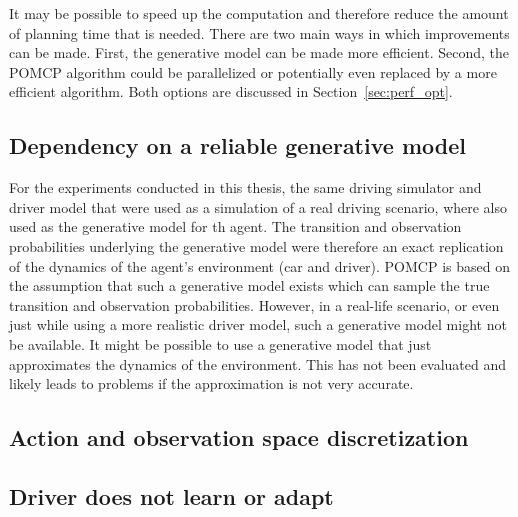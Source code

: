 It may be possible to speed up the computation and therefore reduce the amount of planning time that is needed. There are two main ways in which improvements can be made. First, the generative model can be made more efficient. Second, the POMCP algorithm could be parallelized or potentially even replaced by a more efficient algorithm. Both options are discussed in Section~\ref{sec:perf_opt}. 

\subsection{Dependency on a reliable generative model}

For the experiments conducted in this thesis, the same driving simulator and driver model that were used as a simulation of a real driving scenario, where also used as the generative model for th agent. The transition and observation probabilities underlying the generative model were therefore an exact replication of the dynamics of the agent's environment (car and driver). POMCP is based on the assumption that such a generative model exists which can sample the true transition and observation probabilities. However, in a real-life scenario, or even just while using a more realistic driver model, such a generative model might not be available. It might be possible to use a generative model that just approximates the dynamics of the environment. This has not been evaluated and likely leads to problems if the approximation is not very accurate.

\subsection{Action and observation space discretization}



\subsection{Driver does not learn or adapt}



